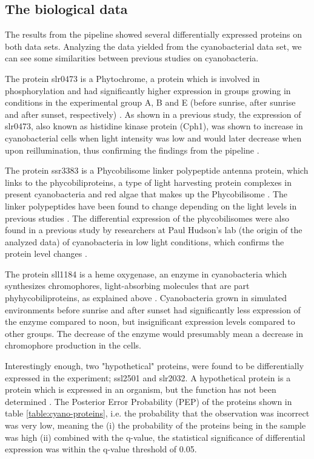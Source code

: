 \subsection{The biological data}
The results from the pipeline showed several differentially expressed proteins on both data sets. Analyzing the data yielded from the cyanobacterial data set, we can see some similarities between previous studies on cyanobacteria.

The protein slr0473 is a Phytochrome, a protein which is involved in phosphorylation and had significantly higher expression in groups growing in conditions in the experimental group A, B and E (before sunrise, after sunrise and after sunset, respectively) \cite{phytochrome}. As shown in a previous study, the expression of slr0473, also known as histidine kinase protein (Cph1), was shown to increase in cyanobacterial cells when light intensity was low and would later decrease when upon reillumination, thus confirming the findings from the pipeline \cite{phytochrome-dark}.

The protein ssr3383 is a Phycobilisome linker polypeptide antenna protein, which links to the phycobiliproteins, a type of light harvesting protein complexes in present cyanobacteria and red algae that makes up the Phycobilisome \cite{phycobilisomes}. The linker polypeptides have been found to change depending on the light levels in previous studies \cite{cyano-low-light}. The differential expression of the phycobilisomes were also found in a previous study by researchers at Paul Hudson's lab (the origin of the analyzed data) of cyanobacteria in low light conditions, which confirms the protein level changes \cite{michael-jahn-cyano}.

The protein sll1184 is a heme oxygenase, an enzyme in cyanobacteria which synthesizes chromophores, light-absorbing molecules that are part phyhycobiliproteins, as explained above \cite{heme-oxygenase, heme-oxygenase-2}. Cyanobacteria grown in simulated environments before sunrise and after sunset had significantly less expression of the enzyme compared to noon, but insignificant expression levels compared to other groups. The decrease of the enzyme would presumably mean a decrease in chromophore production in the cells.

Interestingly enough, two "hypothetical" proteins, were found to be differentially expressed in the experiment; ssl2501 and slr2032. A hypothetical protein is a protein which is expressed in an organism, but the function has not been determined \cite{hypothetical-protein1}. The Posterior Error Probability (PEP) of the proteins shown in table \ref{table:cyano-proteins}, i.e. the probability that the observation was incorrect was very low, meaning the (i) the probability of the proteins being in the sample was high (ii) combined with the q-value, the statistical significance of differential expression was within the q-value threshold of 0.05.

